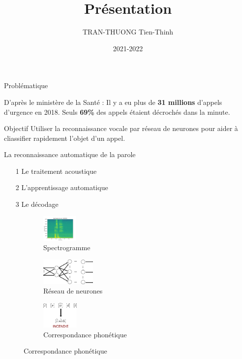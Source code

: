 \documentclass[10pt]{beamer}
\author{TRAN-THUONG Tien-Thinh}
\date{2021-2022}
\title{Présentation}
\begin{document}
\begin{frame}
\titlepage
\end{frame}

\begin{frame}{Problématique}
\begin{alert}{D'après le ministère de la Santé : }
Il y a eu plus de \textbf{31 millions} d'appels d'urgence en 2018. Seuls \textbf{69\%} des appels étaient décrochés dans la minute.
\end{alert}
\begin{block}{Objectif}
Utiliser la reconnaissance vocale par réseau de neurones pour aider à cliassifier rapidement l'objet d'un appel.
\end{block}
\end{frame}


\begin{frame}{La reconnaissance automatique de la parole}
\begin{itemize}
	\item[1] Le traitement acoustique 
	\item[2] L'apprentissage automatique
	\item[3] Le décodage
\end{itemize}
\begin{figure}
	\begin{subfigure}[]{0.3\textwidth}
		\centering
		\includegraphics[height=50px]{1-Incendie-3.jpg}
  		\caption{Spectrogramme}
	\end{subfigure}
	\begin{subfigure}[]{0.3\textwidth}
		\centering
		\includegraphics[height=50px]{2-Reseau.png}
  		\caption{Réseau de neurones}
	\end{subfigure}
	\begin{subfigure}[]{0.3\textwidth}
		\centering
		\includegraphics[height=50px]{3-Matching.png}
		\caption{Correspondance phonétique}
	\end{subfigure}
\end{figure}
\end{frame}
\end{document}
